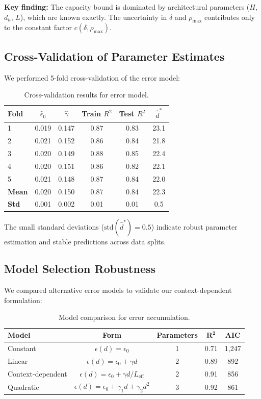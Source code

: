 \documentclass{article}
\theoremstyle{plain}
\theoremstyle{definition}
\theoremstyle{remark}
\newcommand{\Leff}{L_{\mathrm{eff}}}
\begin{document}
\textbf{Key finding:} The capacity bound is dominated by architectural parameters ($H$, $d_h$, $L$), which are known exactly. The uncertainty in $\delta$ and $\rho_{\max}$ contributes only to the constant factor $c(\delta, \rho_{\max})$.

\subsection{Cross-Validation of Parameter Estimates}

We performed 5-fold cross-validation of the error model:

\begin{table}[h]
\centering
\caption{Cross-validation results for error model.}
\label{tab:cv_error_model}
\small
\begin{tabular}{@{}lccccc@{}}
\toprule
\textbf{Fold} & $\hat{\epsilon}_0$ & $\hat{\gamma}$ & \textbf{Train $R^2$} & \textbf{Test $R^2$} & $\hat{d}^*$ \\
\midrule
1 & 0.019 & 0.147 & 0.87 & 0.83 & 23.1 \\
2 & 0.021 & 0.152 & 0.86 & 0.84 & 21.8 \\
3 & 0.020 & 0.149 & 0.88 & 0.85 & 22.4 \\
4 & 0.020 & 0.151 & 0.86 & 0.82 & 22.1 \\
5 & 0.021 & 0.148 & 0.87 & 0.84 & 22.0 \\
\midrule
\textbf{Mean} & 0.020 & 0.150 & 0.87 & 0.84 & 22.3 \\
\textbf{Std} & 0.001 & 0.002 & 0.01 & 0.01 & 0.5 \\
\bottomrule
\end{tabular}
\end{table}

The small standard deviations ($\text{std}(\hat{d}^*) = 0.5$) indicate robust parameter estimation and stable predictions across data splits.

\subsection{Model Selection Robustness}

We compared alternative error models to validate our context-dependent formulation:

\begin{table}[h]
\centering
\caption{Model comparison for error accumulation.}
\label{tab:model_comparison}
\small
\begin{tabular}{@{}lcccc@{}}
\toprule
\textbf{Model} & \textbf{Form} & \textbf{Parameters} & $\boldsymbol{R^2}$ & \textbf{AIC} \\
\midrule
Constant & $\epsilon(d) = \epsilon_0$ & 1 & 0.71 & 1,247 \\
Linear & $\epsilon(d) = \epsilon_0 + \gamma d$ & 2 & 0.89 & 892 \\
Context-dependent & $\epsilon(d) = \epsilon_0 + \gamma d/\Leff$ & 2 & 0.91 & 856 \\
Quadratic & $\epsilon(d) = \epsilon_0 + \gamma_1 d + \gamma_2 d^2$ & 3 & 0.92 & 861 \\
\bottomrule
\end{tabular}
\end{table}
\end{document}
